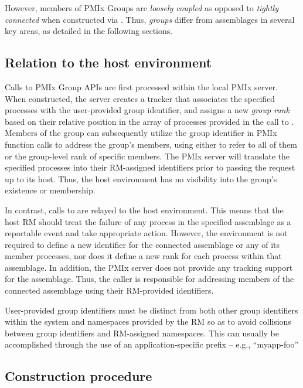 However, members of \ac{PMIx} Groups are \emph{loosely coupled} as opposed to \emph{tightly connected} when constructed via . Thus, \emph{groups} differ from  assemblages in several key areas, as detailed in the following sections.

\subsection{Relation to the host environment}

Calls to \ac{PMIx} Group \acp{API} are first processed within the local \ac{PMIx} server. When constructed, the server creates a tracker that associates the specified processes with the user-provided group identifier, and assigns a new \emph{group rank} based on their relative position in the array of processes provided in the call to . Members of the group can subsequently utilize the group identifier in \ac{PMIx} function calls to address the group’s members, using either  to refer to all of them or the group-level rank of specific members. The \ac{PMIx} server will translate the specified processes into their \ac{RM}-assigned identifiers prior to passing the request up to its host. Thus, the host environment has no visibility into the group’s existence or membership.

In contrast, calls to  are relayed to the host environment. This means that the host \ac{RM} should treat the failure of any process in the specified assemblage as a reportable event and take appropriate action. However, the environment is not required to define a new identifier for the connected assemblage or any of its member processes, nor does it define a new rank for each process within that assemblage. In addition, the \ac{PMIx} server does not provide any tracking support for the assemblage. Thus, the caller is responsible for addressing members of the connected assemblage using their \ac{RM}-provided identifiers.

\adviceuserstart
User-provided group identifiers must be distinct from both other group identifiers within the system and namespaces provided by the \ac{RM} so as to avoid collisions between group identifiers and \ac{RM}-assigned namespaces. This can usually be accomplished through the use of an application-specific prefix – e.g., ``myapp-foo''
\adviceuserend


\subsection{Construction procedure}

